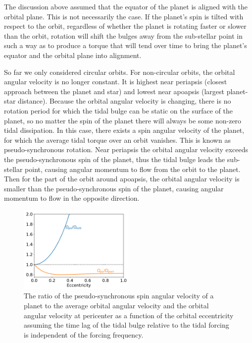 The discussion above assumed that the equator of the planet is aligned with the
orbital plane. This is not necessarily the case. If the planet's spin is tilted
with respect to the orbit, regardless of whether the planet is rotating faster
or slower than the orbit, rotation will shift the bulges away from the
sub-stellar point in such a way as to produce a torque that will tend over time
to bring the planet's equator and the orbital plane into alignment.

So far we only considered circular orbits. For non-circular orbits, the orbital
angular velocity is no longer constant. It is highest near periapsis (closest
approach between the planet and star) and lowest near apoapsis (largest
planet-star distance). Because the orbital angular velocity is changing, there
is no rotation period for which the tidal bulge can be static on the surface of
the planet, so no matter the spin of the planet there will always be some
non-zero tidal dissipation. In this case, there exists a spin angular velocity
of the planet, for which the average tidal torque over an orbit vanishes. This
is known as pseudo-synchronous rotation. Near periapsis the orbital angular
velocity exceeds the pseudo-synchronous spin of the planet, thus the tidal bulge
leads the sub-stellar point, causing angular momentum to flow from the orbit to
the planet. Then for the part of the orbit around apoapsis, the orbital angular
velocity is smaller than the pseudo-synchronous spin of the planet, causing
angular momentum to flow in the opposite direction.

\begin{figure}[t]
%
    \centering
%
    \includegraphics[width=0.5\textwidth]{pseudosync_spin.pdf}
%
    \caption{
%
        The ratio of the pseudo-synchronous spin angular velocity of a planet to
        the average orbital angular velocity and the orbital angular velocity at
        pericenter as a function of the orbital eccentricity assuming the time
        lag of the tidal bulge relative to the tidal forcing is independent of
        the forcing frequency.
%
    }
%
    \label{fig:pseudo-synchronous}
%
\end{figure}

